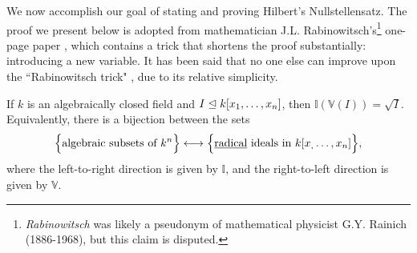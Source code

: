 \documentclass{article}
\newcommand{\V}{\mathbb V}
\newcommand{\I}{\mathbb I}
\begin{document}
We now accomplish our goal of stating and proving Hilbert's Nullstellensatz. The proof we present below is adopted from mathematician J.L. Rabinowitsch's\footnote{\textit{Rabinowitsch} was likely a pseudonym of mathematical physicist G.Y. Rainich (1886-1968), but this claim is disputed.} one-page paper \cite{rabinowitsch}, which contains a trick that shortens the proof substantially: introducing a new variable. It has been said that no one else can improve upon the ``Rabinowitsch trick" \cite{allcock}, due to its relative simplicity.

\begin{theorem} \label{nullstellensatz}
If $k$ is an algebraically closed field and $I\trianglelefteq k[x_1, \ldots, x_n]$, then $\I(\V(I)) = \sqrt I$. Equivalently, there is a bijection between the sets
$$\Big\{\textrm{algebraic subsets of } k^n\Big\} \longleftrightarrow \Big\{\textrm{\underline{radical} ideals in } k[x_,\ldots, x_n]\Big\},$$
where the left-to-right direction is given by $\I$, and the right-to-left direction is given by $\V.$
\end{theorem}
\end{document}
